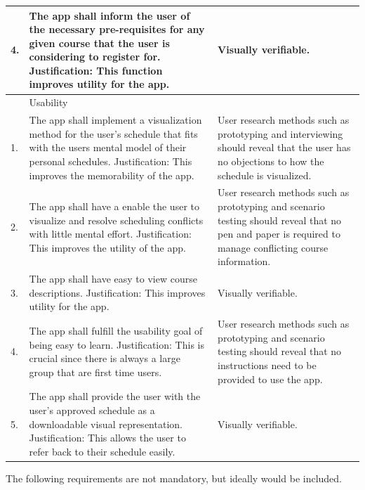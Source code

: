 \documentclass{article}
\begin{document}
\begin{tabular}{ |p{0.3cm}||p{7cm}|p{7cm}|  }
 \\
 4.
 & 
 The app shall inform the user of the necessary pre-requisites for any given course that the user is considering to register for.
 \newline
Justification: This function improves utility for the app.
 & 
 Visually verifiable.
 \\
 \hline
 &
\multicolumn{2}{|l|}{\large Usability}
\\
  \hline
1.
&
The app shall implement a visualization method for the user's schedule that fits with the users mental model of their personal schedules.
\newline
Justification: This improves the memorability of the app. 
& 
User research methods such as prototyping and interviewing should reveal that the user has no objections to how the schedule is visualized.
\\
2.
&
The app shall have a enable the user to visualize and resolve scheduling  conflicts with little mental effort.
\newline
Justification: This improves the utility of the app. 
& 
User research methods such as prototyping and scenario testing should reveal that no pen and paper is required to manage conflicting course information.
 \\
 3.
 & 
 The app shall have easy to view course descriptions.
 \newline
Justification: This improves utility for the app. 
 & 
 Visually verifiable. 
\\

4.
&
The app shall fulfill the usability goal of being easy to learn. \newline
Justification: This is crucial since there is always a large group that are first time users. 
& 
User research methods such as prototyping and scenario testing should reveal that no instructions need to be provided to use the app.
\\

5.
&
The app shall provide the user with the user's approved schedule as a downloadable visual representation.
\newline
Justification: This allows the user to refer back to their schedule easily. 
& 
Visually verifiable.
\\\hline



\end{tabular}

\newpage

The following requirements are not mandatory, but ideally would be included.
\newline
\end{document}

